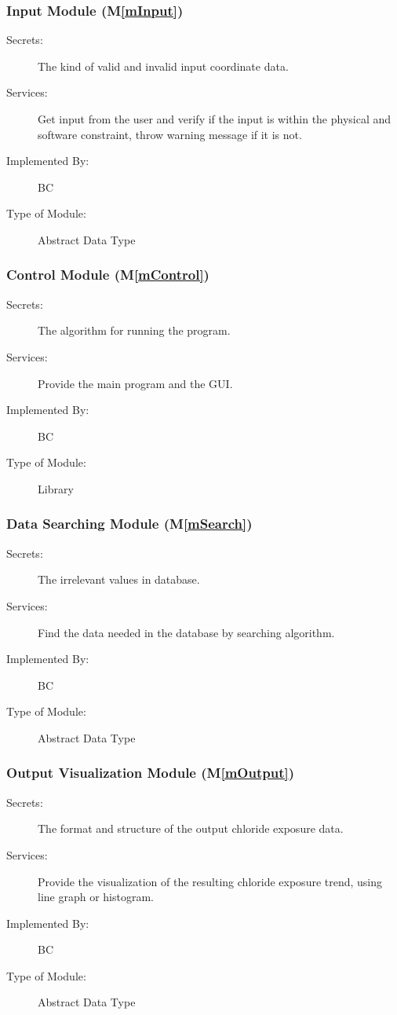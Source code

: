 \documentclass[12pt, titlepage]{article}
\newcommand{\mref}[1]{M\ref{#1}}
\begin{document}
\subsubsection{Input Module (\mref{mInput})}

\begin{description}
\item[Secrets:] The kind of valid and invalid input coordinate data. 
\item[Services:] Get input from the user and verify if the input is within the physical and software constraint, throw warning message if it is not. 
\item[Implemented By:] BC
\item[Type of Module:] Abstract Data Type
\end{description}


\subsubsection{Control Module (\mref{mControl})}
\begin{description}
\item[Secrets:] The algorithm for running the program.
\item[Services:] Provide the main program and the GUI.
\item[Implemented By:] BC
\item[Type of Module:] Library
\end{description}

\subsubsection{Data Searching Module (\mref{mSearch})}
\begin{description}
\item[Secrets:] The irrelevant values in database.
\item[Services:] Find the data needed in the database by searching algorithm.
\item[Implemented By:] BC
\item[Type of Module:] Abstract Data Type
\end{description}

\subsubsection{Output Visualization Module (\mref{mOutput})}
\begin{description}
\item[Secrets:] The format and structure of the output chloride exposure data.
\item[Services:] Provide the visualization of the resulting chloride exposure trend, using line graph or histogram. 
\item[Implemented By:] BC
\item[Type of Module:] Abstract Data Type
\end{description}
\end{document}
